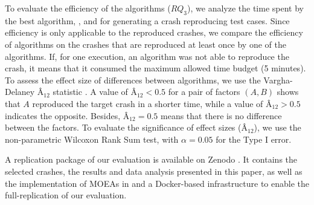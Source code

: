 To evaluate the efficiency of the algorithms ($RQ_3$), we analyze the time spent by the best \moho algorithm, \SGGA, and \decomposition for generating a crash reproducing test cases. Since efficiency is only applicable to the reproduced crashes, we compare the efficiency of algorithms on the crashes that are reproduced at least once by one of the algorithms. 
If, for one execution, an algorithm was not able to reproduce the crash, it means that it consumed the maximum allowed time budget (5 minutes).
To assess the effect size of differences between algorithms, we use the Vargha-Delaney \^A$_{12}$ statistic \cite{vargha}. A value of \^A$_{12} < 0.5$ for a pair of factors $(A,B)$ shows that $A$ reproduced the target crash in a shorter time, while a value of \^A$_{12}> 0.5$ indicates the opposite. Besides, \^A$_{12}= 0.5$ means that there is no difference between the factors.
To evaluate the significance of effect sizes (\^A$_{12}$), we use the non-parametric Wilcoxon Rank Sum test, with $\alpha = 0.05$ for the Type I error.

A replication package of our evaluation is available on Zenodo \cite{zenodoRP}. It contains the selected crashes, the results and data analysis presented in this paper, as well as the implementation of MOEAs in \botsing and a Docker-based infrastructure to enable the full-replication of our evaluation.